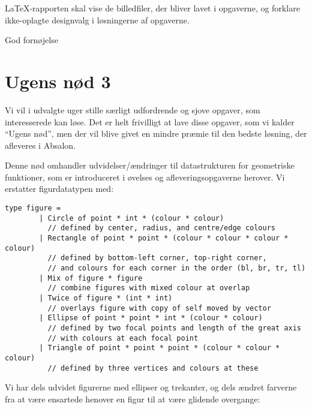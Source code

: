 \documentclass[a4paper]{article}
\begin{document}
\LaTeX-rapporten skal vise de billedfiler, der bliver lavet i
opgaverne, og forklare ikke-oplagte designvalg i løsningerne af
opgaverne.

\vspace{1ex}

\hfill God fornøjelse

\newpage
\section*{Ugens nød 3}

Vi vil i udvalgte uger stille særligt udfordrende og sjove opgaver,
som interesserede kan løse.  Det er helt frivilligt at lave disse
opgaver, som vi kalder ``Ugens nød'', men der vil blive givet en
mindre præmie til den bedste løsning, der afleveres i Absalon.

\vspace{1ex}

Denne nød omhandler udvidelser/ændringer til datastrukturen for
geometriske funktioner, som er introduceret i øvelses og
afleveringsopgaverne herover.  Vi erstatter figurdatatypen med:


\begin{verbatim}
type figure =
        | Circle of point * int * (colour * colour)
          // defined by center, radius, and centre/edge colours
        | Rectangle of point * point * (colour * colour * colour * colour)
          // defined by bottom-left corner, top-right corner,
          // and colours for each corner in the order (bl, br, tr, tl)
        | Mix of figure * figure
          // combine figures with mixed colour at overlap
        | Twice of figure * (int * int)
          // overlays figure with copy of self moved by vector
        | Ellipse of point * point * int * (colour * colour)
          // defined by two focal points and length of the great axis
          // with colours at each focal point
        | Triangle of point * point * point * (colour * colour * colour)
          // defined by three vertices and colours at these
\end{verbatim}

\noindent
Vi har dels udvidet figurerne med ellipser og trekanter, og dels
ændret farverne fra at være ensartede henover en figur til at være
glidende overgange:
\end{document}

